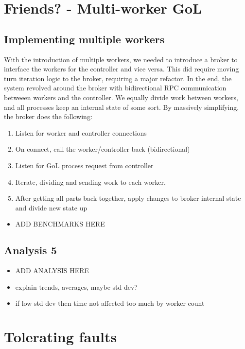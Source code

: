 \documentclass[twoside,twocolumn]{article}
\begin{document}
\section{Friends? - Multi-worker GoL}
\subsection{Implementing multiple workers}
With the introduction of multiple workers, we needed to introduce a broker to interface the workers for the controller
and vice versa. This did require moving turn iteration logic to the broker, requiring a major refactor. In the end, the system
revolved around the broker with bidirectional RPC communication betweeen workers and the controller. We equally divide work
between workers, and all processes keep an internal state of some sort. By massively simplifying, the broker does the following:

\begin{enumerate}[noitemsep]
  \item Listen for worker and controller connections
  \item On connect, call the worker/controller back (bidirectional)
  \item Listen for GoL process request from controller
  \item Iterate, dividing and sending work to each worker.
  \item After getting all parts back together, apply changes to broker internal state and divide new state up
\end{enumerate}
\begin{itemize}
  \item ADD BENCHMARKS HERE
\end{itemize}
\subsection{Analysis 5}
\begin{itemize}
  \item ADD ANALYSIS HERE
  \item explain trends, averages, maybe std dev?
  \item if low std dev then time not affected too much by worker count
\end{itemize}
\section{Tolerating faults}
\end{document}
